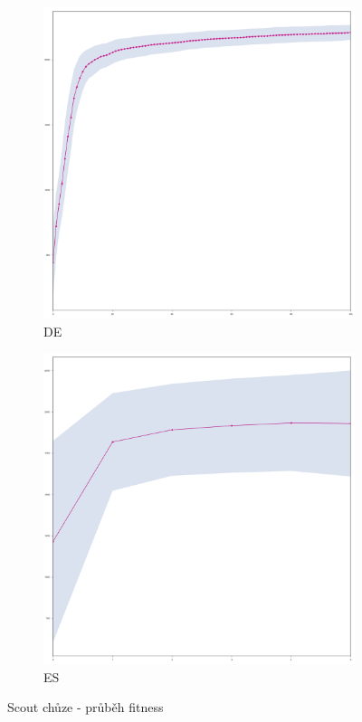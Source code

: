 	\begin{figure}[p]
		\centering
		\begin{subfigure}{.5\textwidth}
			\centering
			\includegraphics[width=\linewidth]{../img/WoodMap/DE/graph_of_CuttorWalk-mean.png}
			\caption{DE}
			\label{obr04:WalkDE}
		\end{subfigure}%
		\begin{subfigure}{.5\textwidth}
			\centering
			\includegraphics[width=\linewidth]{../img/WoodMap/ES/WoodWalkES-mean.png}
			\caption{ES}
			\label{obr04:WalkES}
		\end{subfigure}
		\caption{Scout chůze - průběh fitness }
		\label{obr04:Walk}
	\end{figure}
	\clearpage
  
